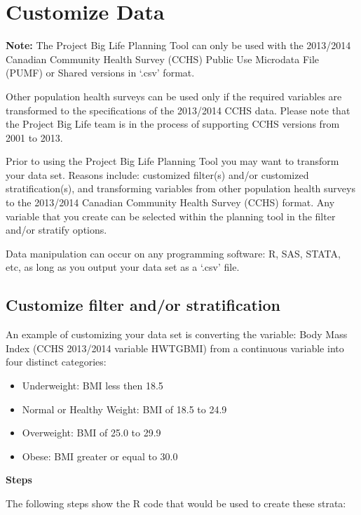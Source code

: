 \documentclass[]{book}
\providecommand{\tightlist}{%
  \setlength{\itemsep}{0pt}\setlength{\parskip}{0pt}}
\begin{document}
\section{Customize Data}\label{customize-data}

\textbf{Note:} The Project Big Life Planning Tool can only be used with
the 2013/2014 Canadian Community Health Survey (CCHS) Public Use
Microdata File (PUMF) or Shared versions in `.csv' format.

Other population health surveys can be used only if the required
variables are transformed to the specifications of the 2013/2014 CCHS
data. Please note that the Project Big Life team is in the process of
supporting CCHS versions from 2001 to 2013.

Prior to using the Project Big Life Planning Tool you may want to
transform your data set. Reasons include: customized filter(s) and/or
customized stratification(s), and transforming variables from other
population health surveys to the 2013/2014 Canadian Community Health
Survey (CCHS) format. Any variable that you create can be selected
within the planning tool in the filter and/or stratify options.

Data manipulation can occur on any programming software: R, SAS, STATA,
etc, as long as you output your data set as a `.csv' file.

\subsection{Customize filter and/or
stratification}\label{customize-filter-andor-stratification}

An example of customizing your data set is converting the variable: Body
Mass Index (CCHS 2013/2014 variable HWTGBMI) from a continuous variable
into four distinct categories:

\begin{itemize}
\tightlist
\item
  Underweight: BMI less then 18.5
\item
  Normal or Healthy Weight: BMI of 18.5 to 24.9
\item
  Overweight: BMI of 25.0 to 29.9
\item
  Obese: BMI greater or equal to 30.0
\end{itemize}

\textbf{Steps}

The following steps show the R code that would be used to create these
strata:
\end{document}
